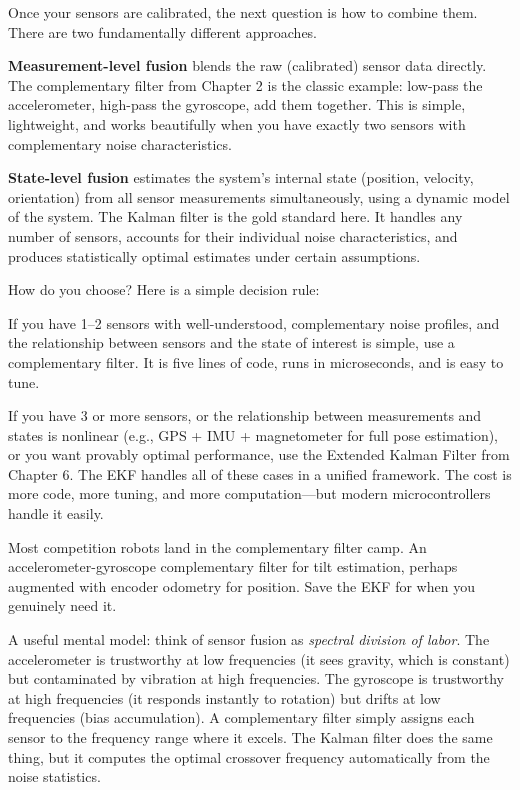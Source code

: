 Once your sensors are calibrated, the next question is how to combine them. There are two fundamentally different approaches.

\textbf{Measurement-level fusion} blends the raw (calibrated) sensor data directly. The complementary filter from Chapter 2 is the classic example: low-pass the accelerometer, high-pass the gyroscope, add them together. This is simple, lightweight, and works beautifully when you have exactly two sensors with complementary noise characteristics.

\textbf{State-level fusion} estimates the system's internal state (position, velocity, orientation) from all sensor measurements simultaneously, using a dynamic model of the system. The Kalman filter is the gold standard here. It handles any number of sensors, accounts for their individual noise characteristics, and produces statistically optimal estimates under certain assumptions.

How do you choose? Here is a simple decision rule:

If you have 1--2 sensors with well-understood, complementary noise profiles, and the relationship between sensors and the state of interest is simple, use a complementary filter. It is five lines of code, runs in microseconds, and is easy to tune.

If you have 3 or more sensors, or the relationship between measurements and states is nonlinear (e.g., GPS + IMU + magnetometer for full pose estimation), or you want provably optimal performance, use the Extended Kalman Filter from Chapter 6. The EKF handles all of these cases in a unified framework. The cost is more code, more tuning, and more computation---but modern microcontrollers handle it easily.

Most competition robots land in the complementary filter camp. An accelerometer-gyroscope complementary filter for tilt estimation, perhaps augmented with encoder odometry for position. Save the EKF for when you genuinely need it.

A useful mental model: think of sensor fusion as \textit{spectral division of labor}. The accelerometer is trustworthy at low frequencies (it sees gravity, which is constant) but contaminated by vibration at high frequencies. The gyroscope is trustworthy at high frequencies (it responds instantly to rotation) but drifts at low frequencies (bias accumulation). A complementary filter simply assigns each sensor to the frequency range where it excels. The Kalman filter does the same thing, but it computes the optimal crossover frequency automatically from the noise statistics.

